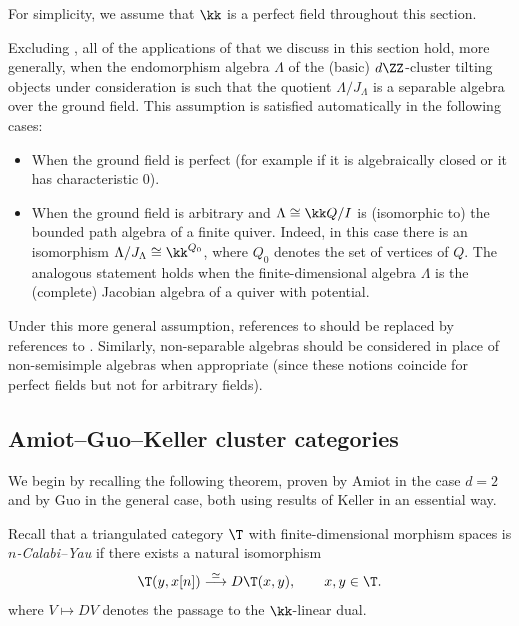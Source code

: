 \documentclass[a4paper]{amsart}
\begin{document}
\begin{setting}
  For simplicity, we assume that $\kk$ is a perfect field throughout this section.
\end{setting}

Excluding , all of the applications of
 that we discuss in this section hold,
more generally, when the endomorphism algebra $\Lambda$ of the (basic)
$d\ZZ$-cluster tilting objects under consideration is such that the quotient
$\Lambda/J_\Lambda$ is a separable algebra over the ground field. This
assumption is satisfied automatically in the following cases:
\begin{itemize}
\item When the ground field is perfect (for example if it is algebraically
  closed or it has characteristic $0$).
\item When the ground field is arbitrary and $\Lambda\cong\kk Q/I$ is
  (isomorphic to) the bounded path algebra of a finite quiver. Indeed, in this
  case there is an isomorphism $\Lambda/J_\Lambda\cong\kk^{Q_0}$, where $Q_0$
  denotes the set of vertices of $Q$. The analogous statement holds when
  the finite-dimensional algebra $\Lambda$ is the (complete) Jacobian algebra of
  a quiver with potential.
\end{itemize}
Under this more general assumption, references to
 should be replaced by references to
. Similarly,
non-separable algebras should be considered in place of non-semisimple algebras
when appropriate (since these notions coincide for perfect fields but not for
arbitrary fields).

\subsection{Amiot--Guo--Keller cluster categories}

We begin by recalling the following theorem, proven by Amiot in the case $d=2$
and by Guo in the general case, both using results of Keller
\cite{Kel05,Kel11} in an essential way.

Recall that a triangulated category $\T$ with finite-dimensional morphism spaces
is \emph{$n$-Calabi--Yau} if there exists a natural isomorphism
\[
  \T(y,x[n])\stackrel{\simeq}{\longrightarrow}D\T(x,y),\qquad x,y\in\T.
\]
where $V\mapsto DV$ denotes the passage to the $\kk$-linear dual.
\end{document}
